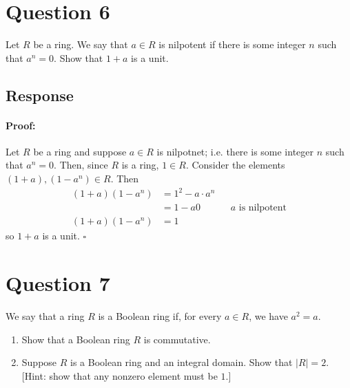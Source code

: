 \documentclass [12pt] {article}
\newenvironment{proof}{\paragraph{Proof:}}{\hfill$\square$}
\begin{document}
\section*{Question 6}
Let $R$ be a ring. We say that $a\in R$ is nilpotent if there is some integer $n$ such that $a^n=0$. 
Show that $1+a$ is a unit. 
\subsection*{Response}
\begin{proof}
    Let $R$ be a ring and suppose $a \in R$ is nilpotnet; i.e. there is some integer $n$ such that
    $a^n = 0$. Then, since $R$ is a ring, $1 \in R$. Consider the elements 
    $(1 + a), (1 - a^n) \in R$. Then
    \begin{align*}
        (1 + a)(1 - a^n) &= 1^2 - a \cdot a^n \\
                         &= 1 - a0 && a \text{ is nilpotent} \\
        (1 + a)(1 - a^n) &= 1
    \end{align*}
    so $1 + a$ is a unit.
\end{proof}
\newpage

\section*{Question 7}
We say that a ring $R$ is a Boolean ring if, for every $a\in R$, we have $a^2=a$. 

\begin{enumerate}
    \item Show that a Boolean ring $R$ is commutative.
    \item Suppose $R$ is a Boolean ring and an integral domain. Show that $|R|=2$. [Hint: show that any nonzero element must be $1$.]
\end{enumerate} 
\end{document}
